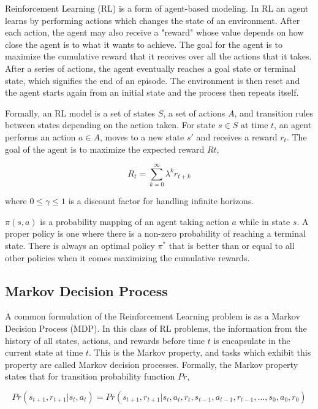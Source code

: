 \documentclass[11pt, oneside]{article}   	%
\begin{document}
Reinforcement Learning (RL) is a form of agent-based modeling. In RL an agent learns by performing actions which changes the state of an environment. After each action, the agent may also receive a "reward" whose value depends on how close the agent is to what it wants to achieve. The goal for the agent is to maximize the cumulative reward that it receives over all the actions that it takes. After a series of actions, the agent eventually reaches a goal state or terminal state, which signifies the end of an episode. The environment is then reset and the agent starts again from an initial state and the process then repeats itself.

\hfill

Formally, an RL model is a set of states $S$, a set of actions $A$, and transition rules between states depending on the action taken. For state $s \in S$ at time $t$, an agent performs an action $a \in A$, moves to a new state $s'$ and receives a reward $r_t$. The goal of the agent is to maximize the expected reward $Rt$,

\begin{equation}
R_t = \sum_{k=0}^{\infty}\lambda^kr_{t+k}
\end{equation}

where $0 \leq \gamma \leq 1$ is a discount factor for handling infinite horizons.

\hfill

$\pi(s,a)$ is a probability mapping of an agent taking action $a$ while in state $s$. A proper policy is one where there is a non-zero probability of reaching a terminal state. There is always an optimal policy $\pi^*$ that is better than or equal to all other policies when it comes maximizing the cumulative rewards. 

\subsection{Markov Decision Process}

A common formulation of the Reinforcement Learning problem is as a Markov Decision Process (MDP). In this class of RL problems, the information from the history of all states, actions, and rewards before time $t$ is encapsulate in the current state at time $t$. This is the Markov property, and tasks which exhibit this property are called Markov decision processes. Formally, the Markov property states that for transition probability function $Pr$,

\begin{equation}
Pr(s_{t+1}, r_{t+1} | s_t, a_t) = Pr(s_{t+1}, r_{t+1} | s_t,a_t, r_t, s_{t-1}, a_{t-1}, r_{t-1},...,s_0, a_0, r_0)
\end{equation}
\end{document}
